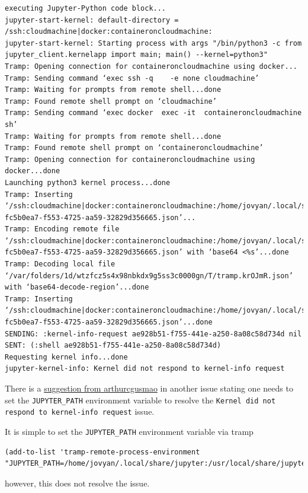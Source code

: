\documentclass[11pt]{article}
\begin{document}
\begin{enumerate}
\begin{verbatim}
executing Jupyter-Python code block...
jupyter-start-kernel: default-directory = /ssh:cloudmachine|docker:containeroncloudmachine:
jupyter-start-kernel: Starting process with args "/bin/python3 -c from jupyter_client.kernelapp import main; main() --kernel=python3"
Tramp: Opening connection for containeroncloudmachine using docker...
Tramp: Sending command ‘exec ssh -q    -e none cloudmachine’
Tramp: Waiting for prompts from remote shell...done
Tramp: Found remote shell prompt on ‘cloudmachine’
Tramp: Sending command ‘exec docker  exec -it  containeroncloudmachine sh’
Tramp: Waiting for prompts from remote shell...done
Tramp: Found remote shell prompt on ‘containeroncloudmachine’
Tramp: Opening connection for containeroncloudmachine using docker...done
Launching python3 kernel process...done
Tramp: Inserting ‘/ssh:cloudmachine|docker:containeroncloudmachine:/home/jovyan/.local/share/jupyter/runtime/kernel-fc5b0ea7-f553-4725-aa59-32829d356665.json’...
Tramp: Encoding remote file ‘/ssh:cloudmachine|docker:containeroncloudmachine:/home/jovyan/.local/share/jupyter/runtime/kernel-fc5b0ea7-f553-4725-aa59-32829d356665.json’ with ‘base64 <%s’...done
Tramp: Decoding local file ‘/var/folders/1d/wtzfcz5s4x98nbkdx9g5ss3c0000gn/T/tramp.krOJmR.json’ with ‘base64-decode-region’...done
Tramp: Inserting ‘/ssh:cloudmachine|docker:containeroncloudmachine:/home/jovyan/.local/share/jupyter/runtime/kernel-fc5b0ea7-f553-4725-aa59-32829d356665.json’...done
SENDING: :kernel-info-request ae928b51-f755-441e-a250-8a08c58d734d nil
SENT: (:shell ae928b51-f755-441e-a250-8a08c58d734d)
Requesting kernel info...done
jupyter-kernel-info: Kernel did not respond to kernel-info request
\end{verbatim}

There is a \href{https://github.com/nnicandro/emacs-jupyter/issues/72\#issuecomment-543952258}{suggestion from arthurcgusmao} in another issue stating one needs to set the \texttt{JUPYTER\_PATH} environment variable to resolve the \texttt{Kernel did not respond to kernel-info request} issue.

It is simple to set the \texttt{JUPYTER\_PATH} environment variable via tramp

\begin{verbatim}
(add-to-list 'tramp-remote-process-environment "JUPYTER_PATH=/home/jovyan/.local/share/jupyter:/usr/local/share/jupyter:/usr/share/jupyter")
\end{verbatim}

however, this does not resolve the issue.


\end{enumerate}
\end{document}

